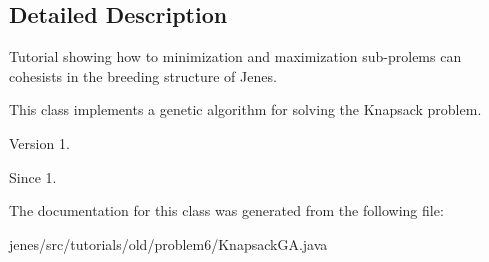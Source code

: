 \subsection{Detailed Description}
Tutorial showing how to minimization and maximization sub-\/prolems can cohesists in the breeding structure of Jenes.

This class implements a genetic algorithm for solving the Knapsack problem.

\begin{DoxyVersion}{Version}
1.
\end{DoxyVersion}
\begin{DoxySince}{Since}
1. 
\end{DoxySince}


The documentation for this class was generated from the following file\-:\begin{DoxyCompactItemize}
\item 
jenes/src/tutorials/old/problem6/Knapsack\-G\-A.\-java\end{DoxyCompactItemize}
